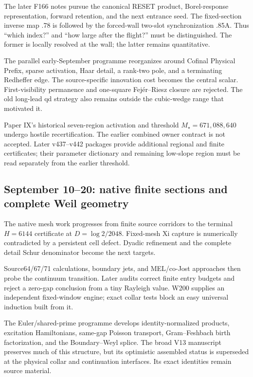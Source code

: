 \documentclass[
  10pt,
  a4paper,
  10pt,
  oneside,
  openany]{book}
\begin{document}
The later F166 notes pursue the canonical RESET product, Borel-response
representation, forward retention, and the next entrance seed. The
fixed-section inverse map .78 is followed by the forced-wall two-slot
synchronization .85A. Thus ``which index?'' and ``how large after the
flight?'' must be distinguished. The former is locally resolved at the
wall; the latter remains quantitative.

The parallel early-September programme reorganizes around Cofinal
Physical Prefix, sparse activation, Haar detail, a rank-two pole, and a
terminating Redheffer edge. The source-specific innovation cost becomes
the central scalar. First-visibility permanence and one-square
Fejér--Riesz closure are rejected. The old long-lead qd strategy also
remains outside the cubic-wedge range that motivated it.

Paper IX's historical seven-region activation and threshold
\(M_\star=671{,}088{,}640\) undergo hostile recertification. The earlier
combined owner contract is not accepted. Later v437--v442 packages
provide additional regional and finite certificates; their parameter
dictionary and remaining low-slope region must be read separately from
the earlier threshold.

\subsection{September 10--20: native finite sections and complete Weil
geometry}\label{september-1020-native-finite-sections-and-complete-weil-geometry}

The native mesh work progresses from finite source corridors to the
terminal \(H=6144\) certificate at \(D=\log2/2048\). Fixed-mesh Xi
capture is numerically contradicted by a persistent cell defect. Dyadic
refinement and the complete detail Schur denominator become the next
targets.

Source64/67/71 calculations, boundary jets, and MEL/co-Jost approaches
then probe the continuum transition. Later audits correct finite entry
budgets and reject a zero-gap conclusion from a tiny Rayleigh value.
W200 supplies an independent fixed-window engine; exact collar tests
block an easy universal induction built from it.

The Euler/shared-prime programme develops identity-normalized products,
excitation Hamiltonians, same-gap Poisson transport, Gram--Feshbach
birth factorization, and the Boundary--Weyl splice. The broad V13
manuscript preserves much of this structure, but its optimistic
assembled status is superseded at the physical collar and continuation
interfaces. Its exact identities remain source material.
\end{document}
